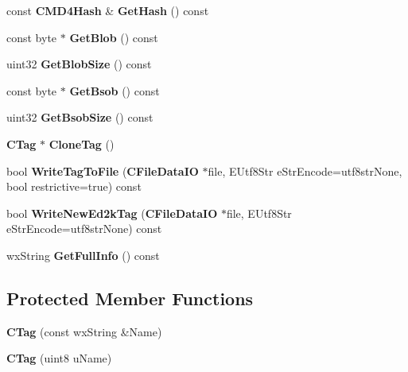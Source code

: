 \begin{DoxyCompactItemize}
\item 
const {\bf CMD4Hash} \& {\bfseries GetHash} () const \label{classCTag_abc1d21b4888b776f478750b01684100f}

\item 
const byte $\ast$ {\bfseries GetBlob} () const \label{classCTag_a0f74040183c60e2bc7bd859657696f0a}

\item 
uint32 {\bfseries GetBlobSize} () const \label{classCTag_a17d19d83ddd23f150de7b31e517bcc07}

\item 
const byte $\ast$ {\bfseries GetBsob} () const \label{classCTag_ab819147ce51740e5605bfd808024356a}

\item 
uint32 {\bfseries GetBsobSize} () const \label{classCTag_a46c16d910f49a8c1b8a62a87afbbf894}

\item 
{\bf CTag} $\ast$ {\bfseries CloneTag} ()\label{classCTag_a3fe4bcecc901cfad592a761324e1dd57}

\item 
bool {\bfseries WriteTagToFile} ({\bf CFileDataIO} $\ast$file, EUtf8Str eStrEncode=utf8strNone, bool restrictive=true) const \label{classCTag_a858d7fda7388e4f98810117eca4f593d}

\item 
bool {\bfseries WriteNewEd2kTag} ({\bf CFileDataIO} $\ast$file, EUtf8Str eStrEncode=utf8strNone) const \label{classCTag_acc7374afc774cb47795af75a135413fd}

\item 
wxString {\bfseries GetFullInfo} () const \label{classCTag_aa2fa15a04e357ccd275014007c5246b2}

\end{DoxyCompactItemize}
\subsection*{Protected Member Functions}
\begin{DoxyCompactItemize}
\item 
{\bfseries CTag} (const wxString \&Name)\label{classCTag_a5b92041781ed1617c42f5e64993e50ab}

\item 
{\bfseries CTag} (uint8 uName)\label{classCTag_a6b114309a7a00fb5524773c4ef8da8ee}

\end{DoxyCompactItemize}
